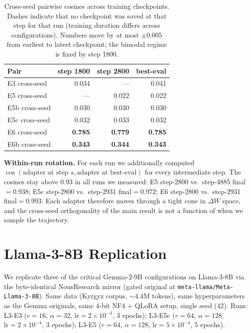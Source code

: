\documentclass[11pt]{article}
\begin{document}
\begin{table}[h]
\centering
\small
\begin{tabular}{lrrr}
\toprule
\textbf{Pair} & \textbf{step 1800} & \textbf{step 2800} & \textbf{best-eval} \\
\midrule
E3 cross-seed   & 0.034 & ---   & 0.041 \\
E5 cross-seed   & ---   & 0.022 & 0.022 \\
E5b cross-seed  & 0.030 & 0.030 & 0.030 \\
E5c cross-seed  & 0.032 & 0.033 & 0.032 \\
E6 cross-seed   & \textbf{0.785} & \textbf{0.779} & \textbf{0.785} \\
E6b cross-seed  & \textbf{0.343} & \textbf{0.344} & \textbf{0.343} \\
\bottomrule
\end{tabular}
\caption{Cross-seed pairwise cosines across training checkpoints. Dashes indicate that no checkpoint was saved at that step for that run (training duration differs across configurations). Numbers move by at most $\pm 0.005$ from earliest to latest checkpoint; the bimodal regime is fixed by step 1800.}
\label{tab:trajectory}
\end{table}

\textbf{Within-run rotation.} For each run we additionally computed $\cos(\text{adapter at step }s, \text{adapter at best-eval})$ for every intermediate step. The cosines stay above $0.93$ in all runs we measured: E5 step-2800 vs.\ step-4885 final$=0.938$; E5c step-2800 vs.\ step-2931 final$=0.972$; E6 step-2800 vs.\ step-2931 final$=0.993$. Each adapter therefore moves through a tight cone in $\Delta W$ space, and the cross-seed orthogonality of the main result is not a function of when we sample the trajectory.

\section{Llama-3-8B Replication}
\label{app:llama3}

We replicate three of the critical Gemma-2-9B configurations on Llama-3-8B \citep{dubey2024llama3} via the byte-identical NousResearch mirror (gated original at \texttt{meta-llama/Meta-Llama-3-8B}). Same data (Kyrgyz corpus, $\sim 4.4$M tokens), same hyperparameters as the Gemma originals, same 4-bit NF4 + QLoRA setup, single seed (42). Runs: L3-E3 ($r{=}16$, $\alpha{=}32$, $\text{lr}{=}2{\times}10^{-4}$, 3 epochs); L3-E5c ($r{=}64$, $\alpha{=}128$, $\text{lr}{=}2{\times}10^{-4}$, 3 epochs); L3-E5 ($r{=}64$, $\alpha{=}128$, $\text{lr}{=}5{\times}10^{-4}$, 5 epochs).
\end{document}
